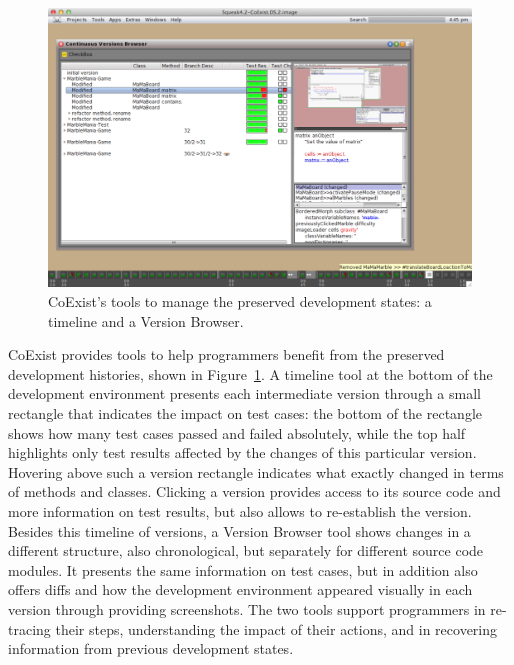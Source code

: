 \begin{figure}[h]
    \centering
    \includegraphics[width=\textwidth]{figures/2_background/4_coexistTools.pdf}
    \caption{CoExist's tools to manage the preserved development states: a timeline and a Version Browser.}
    \label{fig:CoExist}
\end{figure}

CoExist provides tools to help programmers benefit from the preserved development histories, shown in Figure~\ref{fig:CoExist}.
A timeline tool at the bottom of the development environment presents each intermediate version through a small rectangle that indicates the impact on test cases: the bottom of the rectangle shows how many test cases passed and failed absolutely, while the top half highlights only test results affected by the changes of this particular version.
Hovering above such a version rectangle indicates what exactly changed in terms of methods and classes.
Clicking a version provides access to its source code and more information on test results, but also allows to re-establish the version.
Besides this timeline of versions, a Version Browser tool shows changes in a different structure, also chronological, but separately for different source code modules.
It presents the same information on test cases, but in addition also offers diffs and how the development environment appeared visually in each version through providing screenshots.
The two tools support programmers in re-tracing their steps, understanding the impact of their actions, and in recovering information from previous development states.

